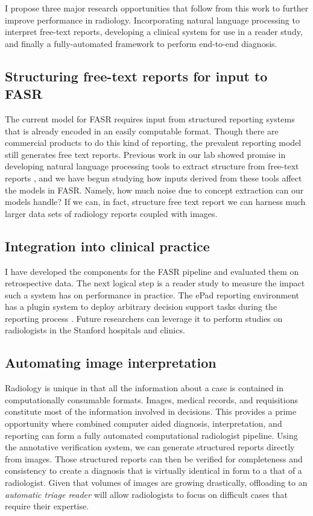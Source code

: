 I propose three major research opportunities that follow from this work to further improve performance in radiology. Incorporating natural language processing to interpret free-text reports, developing a clinical system for use in a reader study, and finally a fully-automated framework to perform end-to-end diagnosis.

\subsection{Structuring free-text reports for input to FASR}
The current model for FASR requires input from structured reporting systems that is already encoded in an easily computable format. Though there are commercial products to do this kind of reporting, the prevalent reporting model still generates free text reports. Previous work in our lab showed promise in developing natural language processing tools to extract structure from free-text reports \cite{Bozkurt:2014jw}, and we have begun studying how inputs derived from these tools affect the models in FASR. Namely, how much noise due to concept extraction can our models handle? If we can, in fact, structure free text report we can harness much larger data sets of radiology reports coupled with images.

\subsection{Integration into clinical practice}
I have developed the components for the FASR pipeline and evaluated them on retrospective data. The next logical step is a reader study to measure the impact such a system has on performance in practice. The ePad reporting environment has a plugin system to deploy arbitrary decision support tasks during the reporting process \cite{Rubin:2008uz}. Future researchers can leverage it to perform studies on radiologists in the Stanford hospitals and clinics.

\subsection{Automating image interpretation}
Radiology is unique in that all the information about a case is contained in computationally consumable formats. Images, medical records, and requisitions constitute most of the information involved in decisions. This provides a prime opportunity where combined computer aided diagnosis, interpretation, and reporting can form a fully automated computational radiologist pipeline. Using the annotative verification system, we can generate structured reports directly from images. Those structured reports can then be verified for completeness and consistency to create a diagnosis that is virtually identical in form to a that of a radiologist. Given that volumes of images are growing drastically, offloading to an \emph{automatic triage reader} will allow radiologists to focus on difficult cases that require their expertise.